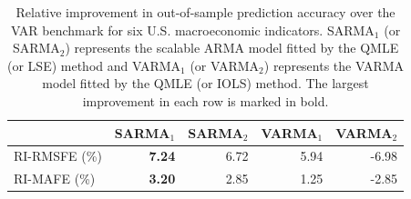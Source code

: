 \begin{table}[htbp]
	\centering
	\caption{\label{table_forecast} Relative improvement in out-of-sample prediction accuracy over the VAR benchmark for six U.S. macroeconomic indicators. SARMA$_1$ (or SARMA$_2$) represents the scalable ARMA model fitted by the QMLE (or LSE) method and VARMA$_1$ (or VARMA$_2$) represents the VARMA model fitted by the QMLE (or IOLS) method. The largest improvement in each row is marked in bold.}
	\begin{tabular}{lrrrr}
		\toprule
		& \multicolumn{1}{c}{SARMA$_1$} & \multicolumn{1}{c}{SARMA$_2$} & \multicolumn{1}{c}{VARMA$_1$} & \multicolumn{1}{c}{VARMA$_2$} \\
		\midrule
		RI-RMSFE (\%) & \textbf{7.24} & 6.72 & 5.94 & -6.98 \\
	RI-MAFE (\%) & \textbf{3.20} & 2.85 & 1.25 & -2.85 \\
		\bottomrule
	\end{tabular}%
	\label{tab:addlabel}%
\end{table}

